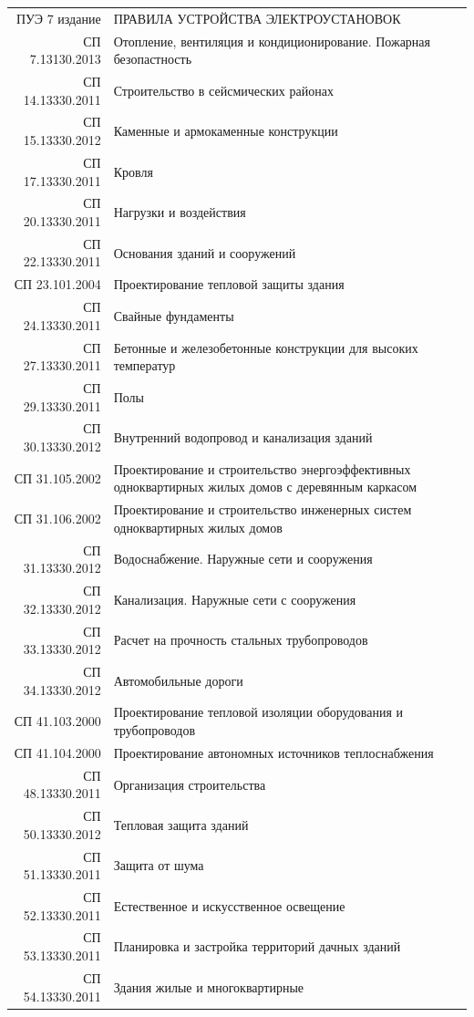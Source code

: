 \documentclass[10pt, twocolumn]{report}
\begin{document}
\begin{tabular}{rl}
ПУЭ 7 издание    & ПРАВИЛА УСТРОЙСТВА ЭЛЕКТРОУСТАНОВОК \\
СП 7.13130.2013  & Отопление, вентиляция и кондиционирование. Пожарная безопастность \\
СП 14.13330.2011 & Строительство в сейсмических районах \\
СП 15.13330.2012 & Каменные и армокаменные конструкции \\
СП 17.13330.2011 & Кровля \\
СП 20.13330.2011 & Нагрузки и воздействия \\
СП 22.13330.2011 & Основания зданий и сооружений \\
СП 23.101.2004   & Проектирование тепловой защиты здания \\
СП 24.13330.2011 & Свайные фундаменты \\
СП 27.13330.2011 & Бетонные и железобетонные конструкции для высоких температур \\
СП 29.13330.2011 & Полы \\
СП 30.13330.2012 & Внутренний водопровод и канализация зданий \\
СП 31.105.2002   & Проектирование и строительство энергоэффективных одноквартирных жилых домов с деревянным каркасом \\
СП 31.106.2002   & Проектирование и строительство инженерных систем одноквартирных жилых домов \\
СП 31.13330.2012 & Водоснабжение. Наружные сети и сооружения \\
СП 32.13330.2012 & Канализация. Наружные сети с сооружения \\
СП 33.13330.2012 & Расчет на прочность стальных трубопроводов \\
СП 34.13330.2012 & Автомобильные дороги \\
СП 41.103.2000   & Проектирование тепловой изоляции оборудования и трубопроводов \\
СП 41.104.2000   & Проектирование автономных источников теплоснабжения \\
СП 48.13330.2011 & Организация строительства \\
СП 50.13330.2012 & Тепловая защита зданий \\
СП 51.13330.2011 & Защита от шума \\
СП 52.13330.2011 & Естественное и искусственное освещение \\
СП 53.13330.2011 & Планировка и застройка территорий дачных зданий \\
СП 54.13330.2011 & Здания жилые и многоквартирные \\

\end{tabular}
\end{document}
